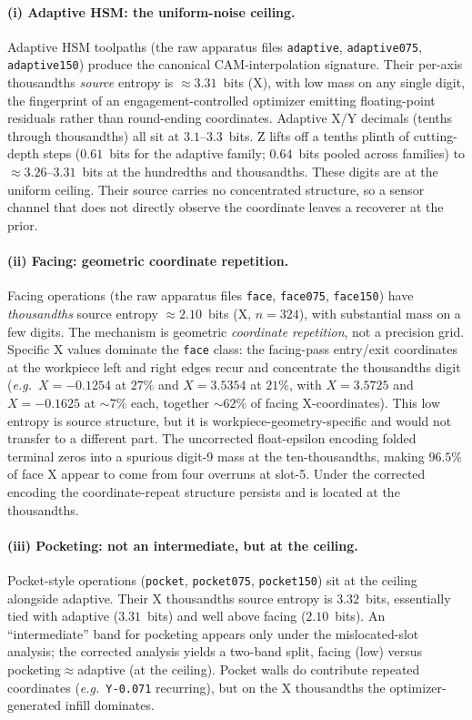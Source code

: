 \documentclass[entropy,article,submit,moreauthors,pdftex]{Definitions/mdpi}
\newcommand{\eg}{\textit{e.g.}}
\begin{document}
\paragraph{(i) Adaptive HSM: the uniform-noise ceiling.} Adaptive HSM toolpaths (the raw apparatus files \texttt{adaptive}, \texttt{adaptive075}, \texttt{adaptive150}) produce the canonical CAM-interpolation signature. Their per-axis thousandths \emph{source} entropy is $\approx 3.31$~bits (X), with low mass on any single digit, the fingerprint of an engagement-controlled optimizer emitting floating-point residuals rather than round-ending coordinates. Adaptive X/Y decimals (tenths through thousandths) all sit at $3.1$--$3.3$~bits. Z lifts off a tenths plinth of cutting-depth steps ($0.61$~bits for the adaptive family; $0.64$~bits pooled across families) to $\approx 3.26$--$3.31$~bits at the hundredths and thousandths. These digits are at the uniform ceiling. Their source carries no concentrated structure, so a sensor channel that does not directly observe the coordinate leaves a recoverer at the prior.

\paragraph{(ii) Facing: geometric coordinate repetition.} Facing operations (the raw apparatus files \texttt{face}, \texttt{face075}, \texttt{face150}) have \emph{thousandths} source entropy $\approx 2.10$~bits (X, $n=324$), with substantial mass on a few digits. The mechanism is geometric \emph{coordinate repetition}, not a precision grid. Specific X values dominate the \texttt{face} class: the facing-pass entry/exit coordinates at the workpiece left and right edges recur and concentrate the thousandths digit (\eg\ $X=-0.1254$ at $27\%$ and $X=3.5354$ at $21\%$, with $X=3.5725$ and $X=-0.1625$ at $\sim\!7\%$ each, together $\sim\!62\%$ of facing X-coordinates). This low entropy is source structure, but it is workpiece-geometry-specific and would not transfer to a different part. The uncorrected float-epsilon encoding folded terminal zeros into a spurious digit-9 mass at the ten-thousandths, making $96.5\%$ of face X appear to come from four overruns at slot-5. Under the corrected encoding the coordinate-repeat structure persists and is located at the thousandths.

\paragraph{(iii) Pocketing: not an intermediate, but at the ceiling.} Pocket-style operations (\texttt{pocket}, \texttt{pocket075}, \texttt{pocket150}) sit at the ceiling alongside adaptive. Their X thousandths source entropy is $3.32$~bits, essentially tied with adaptive ($3.31$~bits) and well above facing ($2.10$~bits). An ``intermediate'' band for pocketing appears only under the mislocated-slot analysis; the corrected analysis yields a two-band split, facing (low) versus pocketing$\approx$adaptive (at the ceiling). Pocket walls do contribute repeated coordinates (\eg\ \texttt{Y-0.071} recurring), but on the X thousandths the optimizer-generated infill dominates.
\end{document}
